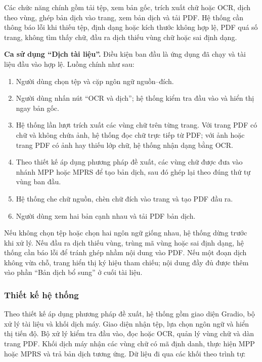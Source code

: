 Các chức năng chính gồm tải tệp, xem bản gốc, trích xuất chữ hoặc OCR, dịch theo vùng, ghép bản dịch vào trang, xem bản dịch và tải PDF. Hệ thống cần thông báo lỗi khi thiếu tệp, định dạng hoặc kích thước không hợp lệ, PDF quá số trang, không tìm thấy chữ, đầu ra dịch thiếu vùng chữ hoặc sai định dạng.

\textbf{Ca sử dụng ``Dịch tài liệu''.} Điều kiện ban đầu là ứng dụng đã chạy và tài liệu đầu vào hợp lệ. Luồng chính như sau:

\begin{enumerate}
    \item Người dùng chọn tệp và cặp ngôn ngữ nguồn--đích.
    \item Người dùng nhấn nút ``OCR và dịch''; hệ thống kiểm tra đầu vào và hiển thị ngay bản gốc.
    \item Hệ thống lần lượt trích xuất các vùng chữ trên từng trang. Với trang PDF có chữ và không chứa ảnh, hệ thống đọc chữ trực tiếp từ PDF; với ảnh hoặc trang PDF có ảnh hay thiếu lớp chữ, hệ thống nhận dạng bằng OCR.
    \item Theo thiết kế áp dụng phương pháp đề xuất, các vùng chữ được đưa vào nhánh MPP hoặc MPRS để tạo bản dịch, sau đó ghép lại theo đúng thứ tự vùng ban đầu.
    \item Hệ thống che chữ nguồn, chèn chữ đích vào trang và tạo PDF đầu ra.
    \item Người dùng xem hai bản cạnh nhau và tải PDF bản dịch.
\end{enumerate}

Nếu không chọn tệp hoặc chọn hai ngôn ngữ giống nhau, hệ thống dừng trước khi xử lý. Nếu đầu ra dịch thiếu vùng, trùng mã vùng hoặc sai định dạng, hệ thống cần báo lỗi để tránh ghép nhầm nội dung vào PDF. Nếu một đoạn dịch không vừa chỗ, trang hiển thị ký hiệu tham chiếu; nội dung đầy đủ được thêm vào phần ``Bản dịch bổ sung'' ở cuối tài liệu.

\subsubsection{Thiết kế hệ thống}

Theo thiết kế áp dụng phương pháp đề xuất, hệ thống gồm giao diện Gradio, bộ xử lý tài liệu và khối dịch máy. Giao diện nhận tệp, lựa chọn ngôn ngữ và hiển thị tiến độ. Bộ xử lý kiểm tra đầu vào, đọc hoặc OCR, quản lý vùng chữ và dàn trang PDF. Khối dịch máy nhận các vùng chữ có mã định danh, thực hiện MPP hoặc MPRS và trả bản dịch tương ứng. Dữ liệu đi qua các khối theo trình tự:

